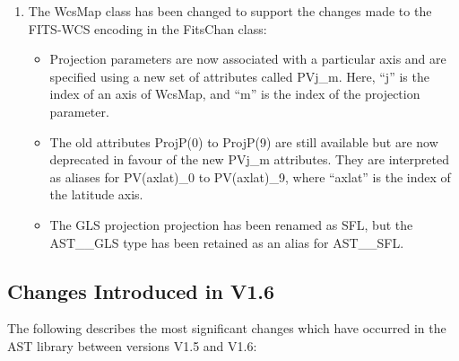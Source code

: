 \documentclass[twoside,11pt]{starlink}
\begin{document}
\begin{enumerate}
\item The WcsMap class has been changed to support the changes made to the
FITS-WCS encoding in the FitsChan class:
\begin{itemize}
\item Projection parameters are now associated with a particular axis and
are specified using a new set of attributes called PVj\_m. Here, ``j'' is
the index of an axis of WcsMap, and ``m'' is the index of the projection
parameter.
\item The old attributes ProjP(0) to ProjP(9) are still available but are
now deprecated in favour of the new PVj\_m attributes. They are interpreted
as aliases for PV(axlat)\_0 to PV(axlat)\_9, where ``axlat'' is the index of
the latitude axis.
\item The GLS projection projection has been renamed as SFL, but the
AST\_\_GLS type has been retained as an alias for AST\_\_SFL.
\end{itemize}

\end{enumerate}

\subsection{Changes Introduced in V1.6}

The following describes the most significant changes which have
occurred in the AST library between versions V1.5 and V1.6:
\end{document}
